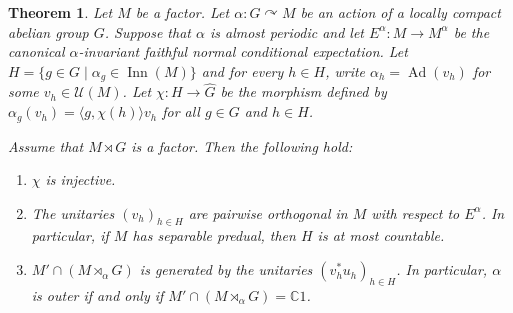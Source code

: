\documentclass[a4paper,11pt]{amsart}
\numberwithin{equation}{section}
\newtheorem{theorem}{Theorem}[section]
\theoremstyle{definition}
\newcommand{\C}{\mathbb{C}}
\newcommand{\cU}{\mathcal{U}}
\newcommand{\Ad}{\operatorname{Ad}}
\newcommand{\Inn}{\operatorname{Inn}}
\begin{document}
\begin{theorem}
    Let $M$ be a factor. Let $\alpha : G \curvearrowright M$ be an action of a locally compact abelian group $G$. Suppose that $\alpha$ is almost periodic and let $E^\alpha : M \rightarrow M^\alpha$ be the canonical $\alpha$-invariant faithful normal conditional expectation. Let $H=\{g \in G \mid \alpha_g \in \Inn(M)\}$ and for every $h \in H$, write $\alpha_h=\Ad(v_h)$ for some $v_h \in \cU(M)$. Let $\chi : H \rightarrow \widehat{G}$ be the morphism defined by $\alpha_g(v_h)=\langle g, \chi(h) \rangle v_h$ for all $g \in G$ and $h \in H$.


    Assume that $M \rtimes G$ is a factor. Then the following hold:
    \begin{enumerate}
        \item $\chi$ is injective.
        \item The unitaries $(v_h)_{h \in H}$ are pairwise orthogonal in $M$ with respect to $E^\alpha$. In particular, if $M$ has separable predual, then $H$ is at most countable.
        \item $M' \cap (M \rtimes_\alpha G)$ is generated by the unitaries $(v_h^*u_h)_{h \in H}$. In particular, $\alpha$ is outer if and only if $M' \cap (M \rtimes_\alpha G)=\C1$.
    \end{enumerate}

\end{theorem}
\end{document}
